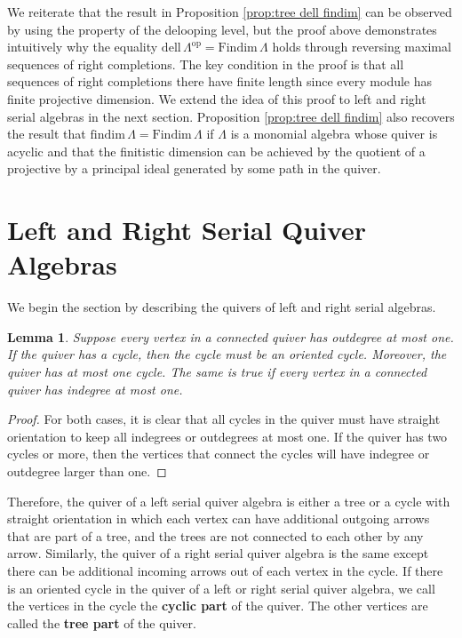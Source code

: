 \documentclass{conm-p-l}
\newcommand{\findim}{\mathrm{findim}\,}
\newcommand{\Findim}{\mathrm{Findim}\,}
\newcommand{\dell}{\mathrm{dell}\,}
\renewcommand{\dell}{\mathrm{dell}\,}
\newcommand{\op}{\mathrm{op}}
\newtheorem{lemma}[theorem]{Lemma}
\theoremstyle{definition}
\theoremstyle{remark}
\numberwithin{equation}{section}
\begin{document}
We reiterate that the result in Proposition \ref{prop:tree dell findim} can be observed by using the property of the delooping level, but the proof above demonstrates intuitively why the equality $\dell\Lambda^{\op}=\Findim\Lambda$ holds through reversing maximal sequences of right completions. The key condition in the proof is that all sequences of right completions there have finite length since every module has finite projective dimension. We extend the idea of this proof to left and right serial algebras in the next section. Proposition \ref{prop:tree dell findim} also recovers the result that $\findim\Lambda=\Findim\Lambda$ if $\Lambda$ is a monomial algebra whose quiver is acyclic and that the finitistic dimension can be achieved by the quotient of a projective by a principal ideal generated by some path in the quiver. 

\section{Left and Right Serial Quiver Algebras}
\label{sec:left and right serial path algebras}

We begin the section by describing the quivers of left and right serial algebras.

\begin{lemma}
Suppose every vertex in a connected quiver has outdegree at most one. If the quiver has a cycle, then the cycle must be an oriented cycle. Moreover, the quiver has at most one cycle. The same is true if every vertex in a connected quiver has indegree at most one.
\end{lemma}

\begin{proof}
For both cases, it is clear that all cycles in the quiver must have straight orientation to keep all indegrees or outdegrees at most one. If the quiver has two cycles or more, then the vertices that connect the cycles will have indegree or outdegree larger than one.
\end{proof}

Therefore, the quiver of a left serial quiver algebra is either a tree or a cycle with straight orientation in which each vertex can have additional outgoing arrows that are part of a tree, and the trees are not connected to each other by any arrow. Similarly, the quiver of a right serial quiver algebra is the same except there can be additional incoming arrows out of each vertex in the cycle. If there is an oriented cycle in the quiver of a left or right serial quiver algebra, we call the vertices in the cycle the \textbf{cyclic part} of the quiver. The other vertices are called the \textbf{tree part} of the quiver.
\end{document}
